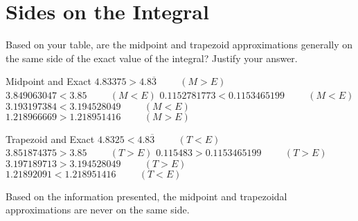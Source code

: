 \documentclass[letterpaper,12pt]{article}
\begin{document}
\section{Sides on the Integral}

\raggedright

\begin{large}

 Based on your table, are the midpoint and trapezoid approximations generally on the same side of the exact value of the integral? Justify your answer.

\end{large}

\vspace{1cm}

\begin{minipage}{0.45\textwidth}
 \begin{center}
  Midpoint and Exact
  \vskip 16pt
  \mbox{$4.83375>4.8\overline{3}\hspace{1cm}(M>E)$}
  \vskip 16pt
  \mbox{$3.849063047<3.85\hspace{1cm}(M<E)$}
  \vskip 16pt
  \mbox{$0.1152781773<0.1153465199\hspace{1cm}(M<E)$}
  \vskip 16pt
  \mbox{$3.193197384<3.194528049\hspace{1cm}(M<E)$}
  \vskip 16pt
  \mbox{$1.218966669>1.218951416\hspace{1cm}(M>E)$}
 \end{center}
\end{minipage}
\hfill
\begin{minipage}{0.45\textwidth}
 \begin{center}
  Trapezoid and Exact
  \vskip 16pt
  $4.8325<4.8\overline{3}\hspace{1cm}(T<E)$
  \vskip 16pt
  $3.851874375>3.85\hspace{1cm}(T>E)$
  \vskip 16pt
  $0.115483>0.1153465199\hspace{1cm}(T>E)$
  \vskip 16pt
  $3.197189713>3.194528049\hspace{1cm}(T>E)$
  \vskip 16pt
  $1.21892091<1.218951416\hspace{1cm}(T<E)$
 \end{center}
\end{minipage}

\vspace{1cm}

Based on the information presented, the midpoint and trapezoidal approximations are never on the same side.

\newpage
\end{document}
